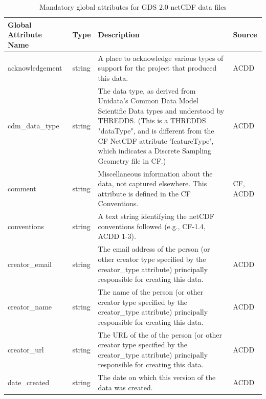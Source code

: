 \begin{longtable}{|p{}|p{}|p{}|p{}|}
\caption{Mandatory global attributes for GDS 2.0 netCDF data files}
\label{tab:global-attributes} \\
\hline \endfirsthead \endhead \endfoot \hline \endlastfoot
\rowcolor{lightgray} \textbf{Global Attribute Name} & \textbf{Type} & \textbf{Description} & \textbf{Source} \\ \hline
\rowcolor{LightCyan} acknowledgement & string & A place to acknowledge various types of support for the project that produced this data. & ACDD \\ \hline

\rowcolor{LightCyan} cdm\_data\_type & string & The data type, as derived from Unidata's Common Data Model Scientific Data types and understood by THREDDS. (This is a THREDDS "dataType", and is different from the CF NetCDF attribute 'featureType', which indicates a Discrete Sampling Geometry file in CF.) & ACDD \\ \hline

\rowcolor{LightCyan} comment & string & Miscellaneous information about the data, not captured elsewhere. This attribute is defined in the CF Conventions. & CF, ACDD \\ \hline

\rowcolor{LightCyan} conventions & string & A text string identifying the netCDF conventions followed (e.g., CF-1.4, ACDD 1-3). &  \\ \hline

\rowcolor{LightCyan} creator\_email & string & The email address of the person (or other creator type specified by the creator\_type attribute) principally responsible for creating this data. & ACDD \\ \hline

\rowcolor{LightCyan} creator\_name & string & The name of the person (or other creator type specified by the creator\_type attribute) principally responsible for creating this data. & ACDD \\ \hline

\rowcolor{LightCyan} creator\_url & string & The URL of the of the person (or other creator type specified by the creator\_type attribute) principally responsible for creating this data. & ACDD \\ \hline

\rowcolor{LightCyan} date\_created & string & The date on which this version of the data was created. & ACDD \\ \hline


\end{longtable}
